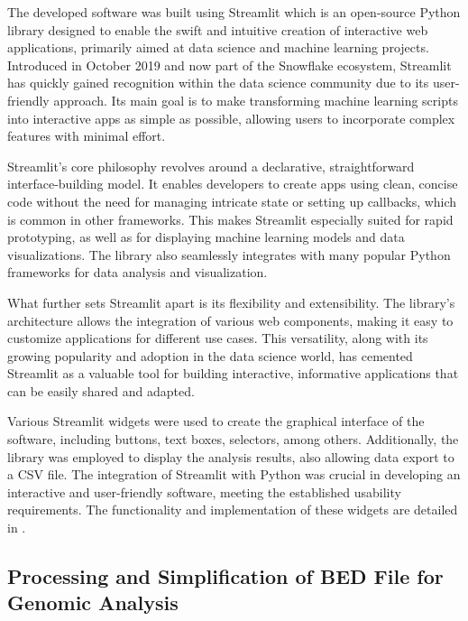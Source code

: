 The developed software was built using Streamlit which is an open-source Python library designed to enable the swift and intuitive creation of interactive web applications, primarily aimed at data science and machine learning projects. Introduced in October 2019 and now part of the Snowflake ecosystem, Streamlit has quickly gained recognition within the data science community due to its user-friendly approach. Its main goal is to make transforming machine learning scripts into interactive apps as simple as possible, allowing users to incorporate complex features with minimal effort. \cite{Sehm2022}

Streamlit's core philosophy revolves around a declarative, straightforward interface-building model. It enables developers to create apps using clean, concise code without the need for managing intricate state or setting up callbacks, which is common in other frameworks. This makes Streamlit especially suited for rapid prototyping, as well as for displaying machine learning models and data visualizations. The library also seamlessly integrates with many popular Python frameworks for data analysis and visualization. \cite{Sehm2022}

What further sets Streamlit apart is its flexibility and extensibility. The library's architecture allows the integration of various web components, making it easy to customize applications for different use cases. This versatility, along with its growing popularity and adoption in the data science world, has cemented Streamlit as a valuable tool for building interactive, informative applications that can be easily shared and adapted. \cite{Dayanithi2023}

Various Streamlit widgets were used to create the graphical interface of the software, including buttons, text boxes, selectors, among others. Additionally, the library was employed to display the analysis results, also allowing data export to a CSV file. The integration of Streamlit with Python was crucial in developing an interactive and user-friendly software, meeting the established usability requirements. The functionality and implementation of these widgets are detailed in \cite{streamlit_doc}.

\subsection{Processing and Simplification of BED File for Genomic Analysis}

